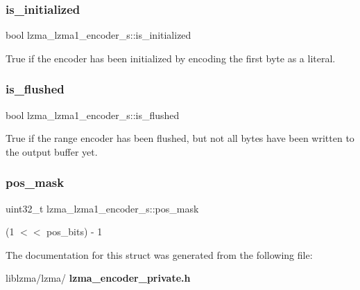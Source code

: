 \subsubsection{is\+\_\+initialized}
{\footnotesize\ttfamily bool lzma\+\_\+lzma1\+\_\+encoder\+\_\+s\+::is\+\_\+initialized}

True if the encoder has been initialized by encoding the first byte as a literal. \mbox{\label{structlzma__lzma1__encoder__s_ac7f09f8a70f2722c1b54ccd41775891c}} 
\subsubsection{is\+\_\+flushed}
{\footnotesize\ttfamily bool lzma\+\_\+lzma1\+\_\+encoder\+\_\+s\+::is\+\_\+flushed}

True if the range encoder has been flushed, but not all bytes have been written to the output buffer yet. \mbox{\label{structlzma__lzma1__encoder__s_a20e17fcaf416134fead2f7c62f235a22}} 
\subsubsection{pos\+\_\+mask}
{\footnotesize\ttfamily uint32\+\_\+t lzma\+\_\+lzma1\+\_\+encoder\+\_\+s\+::pos\+\_\+mask}



(1 $<$$<$ pos\+\_\+bits) -\/ 1 



The documentation for this struct was generated from the following file\+:\begin{DoxyCompactItemize}
\item 
liblzma/lzma/\textbf{ lzma\+\_\+encoder\+\_\+private.\+h}\end{DoxyCompactItemize}
